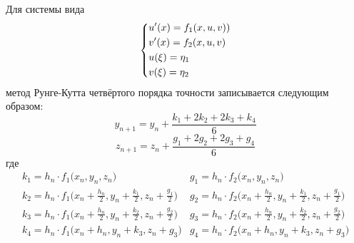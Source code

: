 Для системы вида
\begin{equation*}
\begin{dcases}
    u'(x) = f_1(x, u, v)) \\
    v'(x) = f_2(x, u, v) \\
    u(\xi) = \eta_1 \\
    v(\xi) = \eta_2 \\
\end{dcases}
\end{equation*}
метод Рунге-Кутта четвёртого порядка точности записывается следующим образом:
\begin{equation*}
    y_{n+1} = y_n + \frac{k_1 + 2k_2 + 2k_3 + k_4}{6}
\end{equation*}
\begin{equation*}
    z_{n+1} = z_n + \frac{g_1 + 2g_2 + 2g_3 + g_4}{6}
\end{equation*}
где
\begin{equation*}
\begin{array}{ll}
    k_1 = h_n \cdot f_1\big( x_n, y_n, z_n \big) & g_1 = h_n \cdot f_2\big( x_n, y_n, z_n \big) \\
    k_2 = h_n \cdot f_1\big( x_n + \frac{h_n}{2}, y_n + \frac{k_1}{2}, z_n + \frac{g_1}{2} \big) & g_2 = h_n \cdot f_2\big( x_n + \frac{h_n}{2}, y_n + \frac{k_1}{2}, z_n + \frac{g_1}{2} \big) \\
    k_3 = h_n \cdot f_1\big( x_n + \frac{h_n}{2}, y_n + \frac{k_2}{2}, z_n + \frac{g_2}{2} \big) & g_3 = h_n \cdot f_2\big( x_n + \frac{h_n}{2}, y_n + \frac{k_2}{2}, z_n + \frac{g_2}{2} \big) \\
    k_4 = h_n \cdot f_1\big( x_n + h_n, y_n + k_3, z_n + g_3 \big) & g_4 = h_n \cdot f_2\big( x_n + h_n, y_n + k_3, z_n + g_3 \big) \\
\end{array}
\end{equation*}

